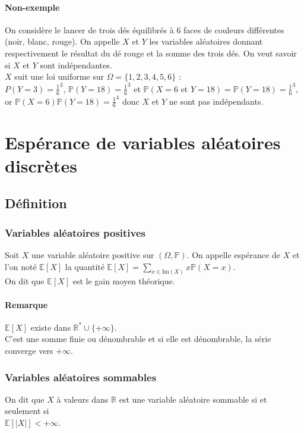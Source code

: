 \documentclass[a4paper,10pt]{book} %
\newcommand{\R}{\mathbb{R}}
\newcommand{\E}{\mathbb{E}} %
\renewcommand{\P}{\mathbb{P}} %
\newcommand\abs[1]{\left|#1\right|}
\newcommand{\Ima}{\mathrm{Im}} %
\begin{document}
\subsubsection{Non-exemple}
On considère le lancer de trois dés équilibrés à 6 faces de couleurs différentes (noir, blanc, rouge). On appelle $X$ et $Y$ les variables aléatoires donnant respectivement le résultat du dé rouge et la somme des trois dés. On veut savoir si $X$ et $Y$ sont indépendantes.\\

$X$ suit une loi uniforme sur $\Omega=\{1,2,3,4,5,6\}$ : \\ $P(Y=3)=\frac{1}{6}^3$, $\P(Y=18)=\frac{1}{6}^3$ et $\P(X=6\text{ et }Y=18)=\P(Y=18)=\frac{1}{6}^3$,\\
or $\P(X=6)\P(Y=18)=\frac{1}{6}^4$ donc $X$ et $Y$ ne sont pas indépendants.



\chapter{Espérance de variables aléatoires discrètes}
\section{Définition}
\subsection{Variables aléatoires positives}
Soit $X$ une variable aléatoire positive sur $(\Omega,\P)$. On appelle espérance de $X$ et l'on noté $\E[X]$ la quantité $\displaystyle \E[X]=\sum_{x\in \Ima(X)}x\P(X=x)$.\\

On dit que $\E[X]$ est le gain moyen théorique.

\subsubsection{Remarque}
$\E[X]$ existe dans $\R^*\cup\{+\infty\}$.\\

C'est une somme finie ou dénombrable et si elle est dénombrable, la série converge vers $+\infty$.

\subsection{Variables aléatoires sommables}
On dit que $X$ à valeurs dans $\R$ est une variable aléatoire sommable si et seulement si\\ $\E[\abs{X}]<+\infty$.
\end{document}
